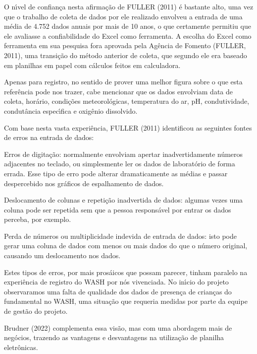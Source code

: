 \documentclass[
12pt,		%
openright,	%
twoside,  %
a4paper,			%
chapter=TITLE,		%
english,			%
french,				%
spanish,			%
brazil				%
]{USPSC-classe/USPSC}
\begin{document}
O n\'{\i}vel de confian\c{c}a nesta afirma\c{c}\~ao de  FULLER (2011) \'e bastante alto, uma vez que o trabalho de coleta de dados por ele realizado envolveu a entrada de uma m\'edia de 4.752 dados anuais por mais de 10 anos, o que certamente permitiu que ele avaliasse a confiabilidade do Excel como ferramenta. A escolha do Excel como ferramenta em sua pesquisa fora aprovada pela Ag\^encia de Fomento  (FULLER, 2011), uma transi\c{c}\~ao do m\'etodo anterior de coleta, que segundo ele era baseado em planilhas em papel com c\'alculos feitos em calculadora.


Apenas para registro, no sentido de prover uma melhor figura sobre o que esta refer\^encia pode nos trazer, cabe mencionar que os dados envolviam data de coleta, hor\'ario, condi\c{c}\~oes meteorol\'ogicas, temperatura do ar, pH, condutividade, condut\^ancia espec\'{\i}fica e oxig\^enio dissolvido.


Com base nesta vasta experi\^encia,  FULLER (2011) identificou as seguintes fontes de erros na entrada de dados:



\begin{alineas}
\item Erros de digita\c{c}\~ao: normalmente envolviam apertar inadvertidamente n\'umeros adjacentes no teclado, ou simplesmente ler os dados de laborat\'orio de forma errada. Esse tipo de erro pode alterar dramaticamente as m\'edias e passar despercebido nos gr\'aficos de espalhamento de dados.
\item Deslocamento de colunas e repeti\c{c}\~ao inadvertida de dados: algumas vezes uma coluna pode ser repetida sem que a pessoa respons\'avel por entrar os dados perceba, por exemplo.
\item Perda de n\'umeros ou multiplicidade indevida de entrada de dados: isto pode gerar uma coluna de dados com menos ou mais dados do que o n\'umero original, causando um deslocamento nos dados.
\end{alineas}

Estes tipos de erros, por mais pros\'aicos que possam parecer, tinham paralelo na experi\^encia de registro do WASH por n\'os vivenciada. No in\'{\i}cio do projeto observaramos uma falta de qualidade dos dados de presen\c{c}a de crian\c{c}as do fundamental no WASH, uma situa\c{c}\~ao que requeria medidas por parte da equipe de gest\~ao do projeto.


 Brudner (2022) complementa essa vis\~ao, mas com uma abordagem mais de neg\'ocios, trazendo as vantagens e desvantagens na utiliza\c{c}\~ao de planilha eletr\^onicas.
\end{document}
